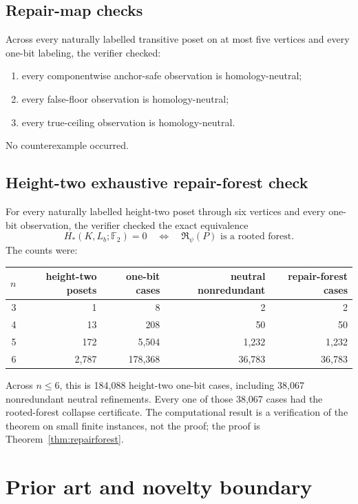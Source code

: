 \documentclass[11pt]{article}
\theoremstyle{definition}
\newcommand{\F}{\mathbb F_2}
\begin{document}
\subsection{Repair-map checks}

Across every naturally labelled transitive poset on at most five vertices and every one-bit labeling, the verifier checked:
\begin{enumerate}[label=(\roman*)]
\item every componentwise anchor-safe observation is homology-neutral;
\item every false-floor observation is homology-neutral;
\item every true-ceiling observation is homology-neutral.
\end{enumerate}
No counterexample occurred.

\subsection{Height-two exhaustive repair-forest check}

For every naturally labelled height-two poset through six vertices and every one-bit observation, the verifier checked the exact equivalence
\[
H_*(K,L_b;\F)=0
\quad\Longleftrightarrow\quad
\mathfrak R_\psi(P)\text{ is a rooted forest}.
\]
The counts were:

\begin{center}
\begin{tabular}{rrrrr}
\toprule
$n$ & height-two posets & one-bit cases & neutral nonredundant & repair-forest cases \\
\midrule
3 & 1 & 8 & 2 & 2 \\
4 & 13 & 208 & 50 & 50 \\
5 & 172 & 5,504 & 1,232 & 1,232 \\
6 & 2,787 & 178,368 & 36,783 & 36,783 \\
\bottomrule
\end{tabular}
\end{center}

Across $n\le6$, this is 184,088 height-two one-bit cases, including 38,067 nonredundant neutral refinements. Every one of those 38,067 cases had the rooted-forest collapse certificate. The computational result is a verification of the theorem on small finite instances, not the proof; the proof is Theorem~\ref{thm:repairforest}.

\section{Prior art and novelty boundary}
\end{document}
